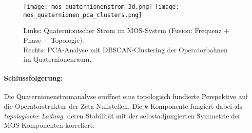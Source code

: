 \begin{figure}[h!]
\centering
\texttt{[image: mos\_quaternionenstrom\_3d.png]}
\texttt{[image: mos\_quaternionen\_pca\_clusters.png]}
\caption{Links: Quaternionischer Strom im MOS-System (Fusion: Frequenz + Phase + Topologie). \\
Rechts: PCA-Analyse mit DBSCAN-Clustering der Operatorbahnen im Quaternionenraum.}
\end{figure}

\paragraph{Schlussfolgerung:}
Die Quaternionenstromanalyse eröffnet eine topologisch fundierte Perspektive auf die Operatorstruktur der Zeta-Nullstellen. Die $k$-Komponente fungiert dabei als \emph{topologische Ladung}, deren Stabilität mit der selbstadjungierten Symmetrie der MOS-Komponenten korreliert.